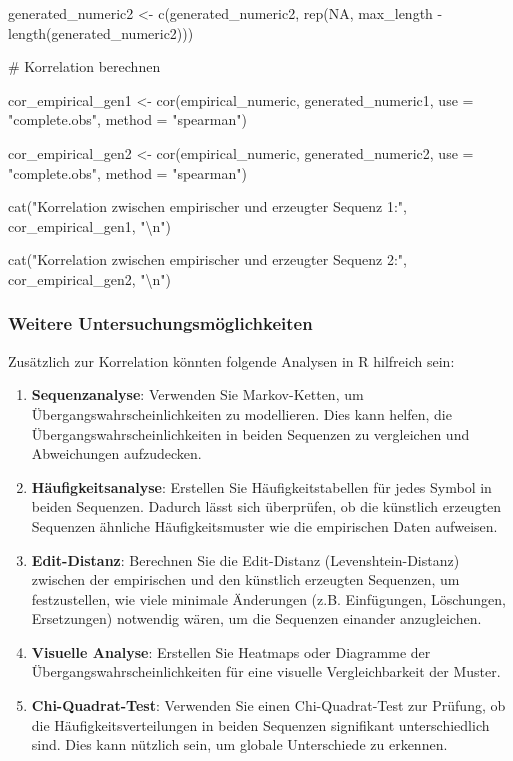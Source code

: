 \documentclass[
]{article}
\begin{document}
generated\_numeric2 \textless- c(generated\_numeric2, rep(NA,
max\_length - length(generated\_numeric2)))

\# Korrelation berechnen

cor\_empirical\_gen1 \textless- cor(empirical\_numeric,
generated\_numeric1, use = "complete.obs", method = "spearman")

cor\_empirical\_gen2 \textless- cor(empirical\_numeric,
generated\_numeric2, use = "complete.obs", method = "spearman")

cat("Korrelation zwischen empirischer und erzeugter Sequenz 1:",
cor\_empirical\_gen1, "\textbackslash n")

cat("Korrelation zwischen empirischer und erzeugter Sequenz 2:",
cor\_empirical\_gen2, "\textbackslash n")

\subsubsection{\texorpdfstring{\textbf{Weitere
Untersuchungsmöglichkeiten}}{Weitere Untersuchungsmöglichkeiten}}\label{weitere-untersuchungsmuxf6glichkeiten}

Zusätzlich zur Korrelation könnten folgende Analysen in R hilfreich
sein:

\begin{enumerate}
\def\labelenumi{\arabic{enumi}.}
\item
  \textbf{Sequenzanalyse}: Verwenden Sie Markov-Ketten, um
  Übergangswahrscheinlichkeiten zu modellieren. Dies kann helfen, die
  Übergangswahrscheinlichkeiten in beiden Sequenzen zu vergleichen und
  Abweichungen aufzudecken.
\item
  \textbf{Häufigkeitsanalyse}: Erstellen Sie Häufigkeitstabellen für
  jedes Symbol in beiden Sequenzen. Dadurch lässt sich überprüfen, ob
  die künstlich erzeugten Sequenzen ähnliche Häufigkeitsmuster wie die
  empirischen Daten aufweisen.
\item
  \textbf{Edit-Distanz}: Berechnen Sie die Edit-Distanz
  (Levenshtein-Distanz) zwischen der empirischen und den künstlich
  erzeugten Sequenzen, um festzustellen, wie viele minimale Änderungen
  (z.B. Einfügungen, Löschungen, Ersetzungen) notwendig wären, um die
  Sequenzen einander anzugleichen.
\item
  \textbf{Visuelle Analyse}: Erstellen Sie Heatmaps oder Diagramme der
  Übergangswahrscheinlichkeiten für eine visuelle Vergleichbarkeit der
  Muster.
\item
  \textbf{Chi-Quadrat-Test}: Verwenden Sie einen Chi-Quadrat-Test zur
  Prüfung, ob die Häufigkeitsverteilungen in beiden Sequenzen
  signifikant unterschiedlich sind. Dies kann nützlich sein, um globale
  Unterschiede zu erkennen.
\end{enumerate}
\end{document}
